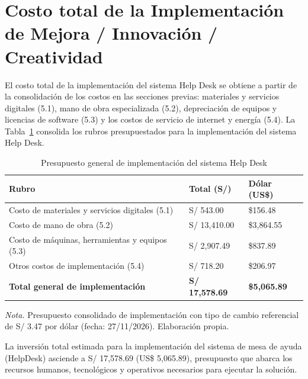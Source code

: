 \section{Costo total de la Implementación de Mejora / Innovación / Creatividad}

El costo total de la implementación del sistema Help Desk se obtiene a partir de la consolidación de los costos en las secciones previas: materiales y servicios digitales (5.1), mano de obra especializada (5.2), depreciación de equipos y licencias de software (5.3) y los costos de servicio de internet y energía (5.4). La Tabla~\ref{tab:presupuesto_general} consolida los rubros presupuestados para la implementación del sistema Help Desk.

\begin{table}[htbp]
\centering
\caption{Presupuesto general de implementación del sistema Help Desk}
\label{tab:presupuesto_general}
\begin{tabularx}{\textwidth}{@{}>{\raggedright\arraybackslash}X >{\raggedleft\arraybackslash}p{2.6cm} >{\raggedleft\arraybackslash}p{2.6cm}@{}}
\toprule
\textbf{Rubro} & \textbf{Total (S/)} & \textbf{Dólar (US\$)} \\
\midrule
Costo de materiales y servicios digitales (5.1) & S/ 543.00 & \$156.48 \\
Costo de mano de obra (5.2) & S/ 13,410.00 & \$3,864.55 \\
Costo de máquinas, herramientas y equipos (5.3) & S/ 2,907.49 & \$837.89 \\
Otros costos de implementación (5.4) & S/ 718.20 & \$206.97 \\
\midrule
\textbf{Total general de implementación} & \textbf{S/ 17,578.69} & \textbf{\$5,065.89} \\
\bottomrule
\end{tabularx}
\par\vspace{0.3em}
\raggedright\footnotesize{\textit{Nota.} Presupuesto consolidado de implementación con tipo de cambio referencial de S/ 3.47 por dólar (fecha: 27/11/2026). Elaboración propia.}
\end{table}

\newpage

\leavevmode\strut\par

\indent La inversión total estimada para la implementación del sistema de mesa de ayuda (HelpDesk) asciende a S/ 17,578.69 (US\$ 5,065.89), presupuesto que abarca los recursos humanos, tecnológicos y operativos necesarios para ejecutar la solución. 

